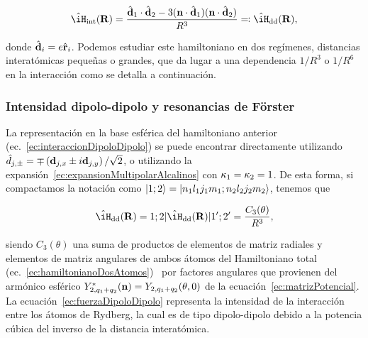\begin{equation}
\label{ec:interaccionDipoloDipolo}
\hat{\iH}_\sm{\text{int}}(\vektor{R})=\frac{\hat{\vektor{d}}_\sm{1}\cdot\hat{\vektor{d}}_\sm{2}-3(\vektor{n}\cdot\hat{\vektor{d}}_\sm{1})(\vektor{n}\cdot\hat{\vektor{d}}_\sm{2})}{R^{3}}\eqqcolon\hat{\iH}_\sm{\text{dd}}(\vektor{R}),
\end{equation}

donde $\hat{\text{\textbf{d}}}_{i}=e\hat{\text{\textbf{r}}}_{i}$. Podemos estudiar este hamiltoniano en dos regímenes, distancias interatómicas pequeñas o grandes, que da lugar a una dependencia $1/R^{3}$ o $1/R^{6}$ en la interacción como se detalla a continuación.

\subsubsection{\label{ssub:resonanciaForster}Intensidad dipolo-dipolo y resonancias de Förster}

La representación en la base esférica del hamiltoniano anterior (ec.~\ref{ec:interaccionDipoloDipolo}) se puede encontrar directamente utilizando $\hat{d}_{j,\pm}=\mp\left(\text{\textbf{d}}_{j,x}\pm i\text{\textbf{d}}_{j,y}\right)/\sqrt{2}$, o utilizando la expansión~\ref{ec:expansionMultipolarAlcalinos} con $\kappa_{1}=\kappa_{2}=1$. De esta forma, si compactamos la notación como $\ket{1;2}=\ket*{n_\sm{1}l_\sm{1}j_\sm{1}m_\sm{1};n_\sm{2}l_\sm{2}j_\sm{2}m_\sm{2}}$, tenemos que

\begin{equation}
\label{ec:fuerzaDipoloDipolo}
\braket{\hat{\iH}_\sm{\text{dd}}(\vektor{R})}=\braket{1;2|\hat{\iH}_\sm{\text{dd}}(\vektor{R})|1';2'}=\frac{C_\sm{3}(\theta)}{R^{3}},
\end{equation}

siendo $C_{3}(\theta)$ una suma de productos de elementos de matriz radiales y elementos de matriz angulares de ambos átomos del Hamiltoniano total (ec.~\ref{ec:hamiltonianoDosAtomos})~\cite{paris} por factores angulares que provienen del armónico esférico {\color{purple}$Y_{2,q_{1}+q_{2}}^{*}(\text{\textbf{n}})=Y_{2,q_{1}+q_{2}} (\theta,0)$} de la ecuación~\ref{ec:matrizPotencial}. La ecuación~\ref{ec:fuerzaDipoloDipolo} representa la intensidad de la interacción entre los átomos de Rydberg, la cual es de tipo dipolo-dipolo debido a la potencia cúbica del inverso de la distancia interatómica.


